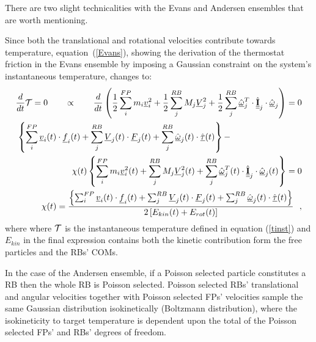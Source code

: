 There are two slight technicalities with the Evans and Andersen ensembles that are
worth mentioning.

Since both the translational and rotational velocities contribute towards temperature,
equation~(\ref{Evans}), showing the derivation of the thermostat friction in the Evans
ensemble by imposing a Gaussian constraint on the system's instantaneous temperature,
changes to:
\begin{eqnarray}
\frac{d}{dt} {\cal T} = 0 ~~~~~~\propto~~~~~~ \frac{d}{dt} \left( \frac{1}{2} \sum_{i}^{FP} m_{i} \mbox{$\underline{v}$}_{i}^{2} + \frac{1}{2} \sum_{j}^{RB} M_{j} \mbox{$\underline{V}$}_{j}^{2} +
\frac{1}{2} \sum_{j}^{RB} \hat{\mbox{$\underline{\omega}$}}_{j}^{T} \cdot \hat{\mbox{$\underline{\underline{\bf I}}$}}_{j} \cdot \hat{\mbox{$\underline{\omega}$}}_{j} \right) = 0 \nonumber \\
\left\{ \sum_{i}^{FP} \mbox{$\underline{v}$}_{i}(t) \cdot \mbox{$\underline{f}$}_{i}(t) + \sum_{j}^{RB} \mbox{$\underline{V}$}_{j}(t) \cdot \mbox{$\underline{F}$}_{j}(t) +
\sum_{j}^{RB} \hat{\mbox{$\underline{\omega}$}}_{j}(t) \cdot \hat{\mbox{$\underline{\tau}$}}(t) \right\} - ~~~~~~~~~~~~~~~~~~~~~~~~~  \nonumber \\
~~~~~~~~~~~~~~~~~~~\chi (t) \left\{ \sum_{i}^{FP} m_{i} \mbox{$\underline{v}$}_{i}^{2}(t) +
\sum_{j}^{RB} M_{j} \mbox{$\underline{V}$}_{j}^{2}(t) + \sum_{j}^{RB} \hat{\mbox{$\underline{\omega}$}}_{j}^{T}(t) \cdot \hat{\mbox{$\underline{\underline{\bf I}}$}}_{j} \cdot \hat{\mbox{$\underline{\omega}$}}_{j}(t) \right\} = 0 \\
\chi (t) = \frac {\left\{ \sum_{i}^{FP} \mbox{$\underline{v}$}_{i}(t) \cdot \mbox{$\underline{f}$}_{i}(t) + \sum_{j}^{RB} \mbox{$\underline{V}$}_{j}(t) \cdot \mbox{$\underline{F}$}_{j}(t) +
\sum_{j}^{RB} \hat{\mbox{$\underline{\omega}$}}_{j}(t) \cdot \hat{\mbox{$\underline{\tau}$}}(t) \right\}} {2\left[ E_{kin}(t) + E_{rot}(t) \right]}~~, \nonumber
\end{eqnarray}
where where $\cal T$ is the instantaneous temperature defined in equation
(\ref {tinst}) and $E_{kin}$ in the final expression contains both the kinetic
contribution form the free particles and the RBs' COMs.

In the case of the Andersen ensemble, if a Poisson selected particle constitutes a
RB then the whole RB is Poisson selected.  Poisson selected RBs' translational and
angular velocities together with Poisson selected FPs' velocities sample the same
Gaussian distribution isokinetically (Boltzmann distribution), where the
isokineticity to target temperature is dependent upon the total of the Poisson
selected FPs' and RBs' degrees of freedom.
